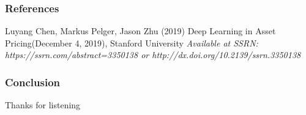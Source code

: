 \documentclass{beamer}
\begin{document}

\begin{frame}
\frametitle{References}
\footnotesize{
\begin{thebibliography}{99} %
 Luyang Chen,  Markus Pelger, Jason Zhu (2019)
\newblock Deep Learning in Asset Pricing(December 4, 2019), Stanford University
\newblock \emph{ Available at SSRN: https://ssrn.com/abstract=3350138 or http://dx.doi.org/10.2139/ssrn.3350138
}
\end{thebibliography}
}
\end{frame}


\begin{frame}
\frametitle{Conclusion}
\Huge{\centerline{Thanks for listening}}
\end{frame}

\end{document}
